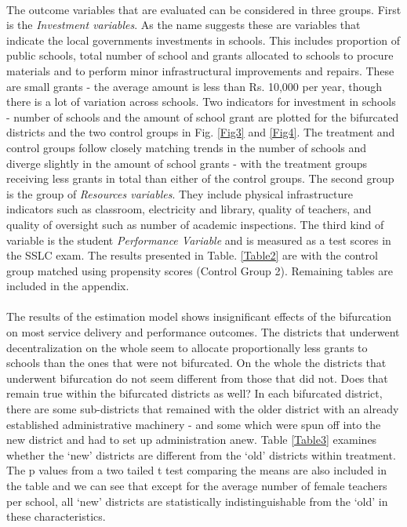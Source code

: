 \documentclass[12pt, a4paper]{article}
\begin{document}
\paragraph{} The outcome variables that are evaluated can be considered in three groups. First is the \textit{Investment variables}. As the name suggests these are variables that indicate the local governments investments in schools. This includes proportion of public schools, total number of school and grants allocated to schools to procure materials and to perform minor infrastructural improvements and repairs. These are small grants - the average amount is less than Rs. 10,000 per year, though there is a lot of variation across schools. Two indicators for investment in schools - number of schools and the amount of school grant are plotted for the bifurcated districts and the two control groups in Fig. \ref{Fig3} and \ref{Fig4}. The treatment and control groups follow closely matching trends in the number of schools and diverge slightly in the amount of school grants - with the treatment groups receiving less grants in total than either of the control groups. The second group is the group of \textit{Resources variables}. They include physical infrastructure indicators such as classroom, electricity and library, quality of teachers, and quality of oversight such as number of academic inspections. The third kind of variable is the student \textit{Performance Variable} and is measured as a test scores in the SSLC exam. The results presented in Table. \ref{Table2} are with the control group matched using propensity scores (Control Group 2). Remaining tables are included in the appendix.
\nocite{hinnerich2009merging} \nocite{jordahl2010merged} \nocite{reingewertz2012municipal} \nocite{blesse2013municipal}

\paragraph{} The results of the estimation model shows insignificant effects of the bifurcation on most service delivery and performance outcomes. The districts that underwent decentralization on the whole seem to allocate proportionally less grants to schools than the ones that were not bifurcated. On the whole the districts that underwent bifurcation do not seem different from those that did not. Does that remain true within the bifurcated districts as well? In each bifurcated district, there are some sub-districts that remained with the older district with an already established administrative machinery - and some which were spun off into the new district and had to set up administration anew. Table \ref{Table3} examines whether the `new' districts are different from the `old' districts within treatment. The p values from a two tailed t test comparing the means are also included in the table and we can see that except for the average number of female teachers per school, all `new' districts are statistically indistinguishable from the `old' in these characteristics. 
\end{document}
